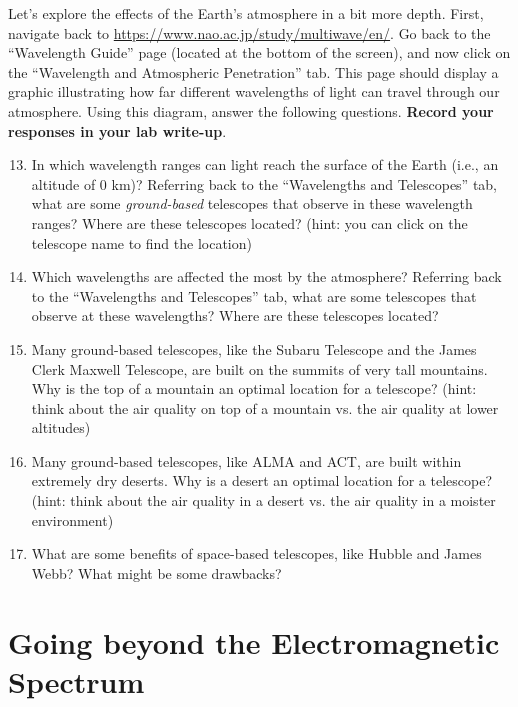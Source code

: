 \documentclass[11pt]{article}
\begin{document}
Let's explore the effects of the Earth's atmosphere in a bit more depth. First, navigate back to \url{https://www.nao.ac.jp/study/multiwave/en/}. Go back to the ``Wavelength Guide'' page (located at the bottom of the screen), and now click on the ``Wavelength and Atmospheric Penetration'' tab. This page should display a graphic illustrating how far different wavelengths of light can travel through our atmosphere. Using this diagram, answer the following questions. \textbf{Record your responses in your lab write-up}.
\begin{enumerate}
    \setcounter{enumi}{12}
    \item In which wavelength ranges can light reach the surface of the Earth (i.e., an altitude of 0 km)? Referring back to the ``Wavelengths and Telescopes'' tab, what are some \emph{ground-based} telescopes that observe in these wavelength ranges? Where are these telescopes located? (hint: you can click on the telescope name to find the location)
    
    \item Which wavelengths are affected the most by the atmosphere? Referring back to the ``Wavelengths and Telescopes'' tab, what are some telescopes that observe at these wavelengths? Where are these telescopes located?
    
    \item Many ground-based telescopes, like the Subaru Telescope and the James Clerk Maxwell Telescope, are built on the summits of very tall mountains. Why is the top of a mountain an optimal location for a telescope? (hint: think about the air quality on top of a mountain vs. the air quality at lower altitudes)
    
    \item Many ground-based telescopes, like ALMA and ACT, are built within extremely dry deserts. Why is a desert an optimal location for a telescope? (hint: think about the air quality in a desert vs. the air quality in a moister environment)
    
    \item What are some benefits of space-based telescopes, like Hubble and James Webb? What might be some drawbacks?
\end{enumerate}

\bigskip

\section{Going beyond the Electromagnetic Spectrum}
\end{document}
